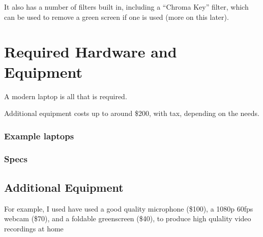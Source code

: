 \documentclass[sigconf]{acmart}
\begin{document}
It also has a number of filters built in, including a  ``Chroma Key'' filter, which can be used to remove a green screen if one is used (more on this later).



\section{Required Hardware and Equipment}
A modern laptop is all that is required.

Additional equipment costs up to around \$200, with tax, depending on the needs.

\subsubsection{Example laptops}
\subsubsection{Specs}






\subsection{Additional Equipment}

For example, I used have used a good quality microphone (\$100), a 1080p 60fps webcam (\$70), and a foldable greenscreen (\$40), to produce high qulality video recordings at home
\end{document}
